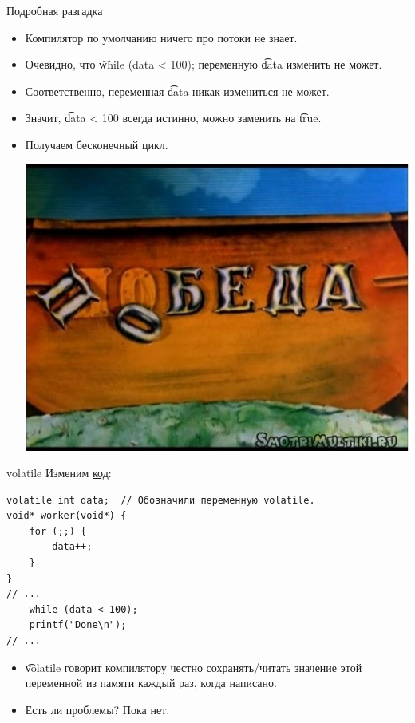 \begin{frame}{Подробная разгадка}
	\begin{itemize}
		\item Компилятор по умолчанию ничего про потоки не знает.
		\item Очевидно, что \t{while (data < 100);} переменную \t{data} изменить не может.
		\item Соответственно, переменная \t{data} никак измениться не может.
		\item Значит, \t{data < 100} всегда истинно, можно заменить на \t{true}.
		\item Получаем бесконечный цикл.
			\begin{center}
				\includegraphics[scale=0.3]{win-lose.jpg}
			\end{center}
	\end{itemize}
\end{frame}

\begin{frame}[fragile]{volatile}
	Изменим \href{https://github.com/yeputons/fall-2017-paradigms/raw/master/171113/sources/02-volatile.cpp}{код}:
\begin{verbatim}
volatile int data;  // Обозначили переменную volatile.
void* worker(void*) {
    for (;;) {
        data++;
    }
}
// ...
    while (data < 100);
    printf("Done\n");
// ...
\end{verbatim}
	\begin{itemize}
		\item \t{volatile} говорит компилятору честно сохранять/читать значение этой переменной из памяти каждый раз, когда написано.
		\item Есть ли проблемы? \pause Пока нет.
	\end{itemize}
\end{frame}

